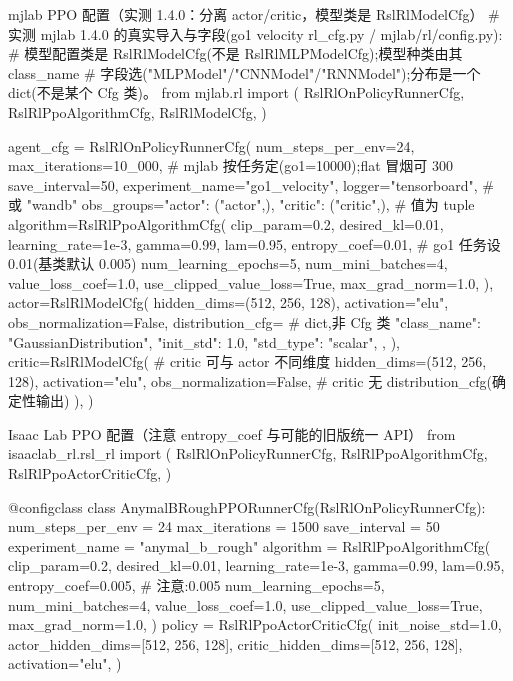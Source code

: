 \begin{codebox}[Python]{mjlab PPO 配置（实测 1.4.0：分离 actor/critic，模型类是 RslRlModelCfg）}
# 实测 mjlab 1.4.0 的真实导入与字段(go1 velocity rl_cfg.py / mjlab/rl/config.py):
#   模型配置类是 RslRlModelCfg(不是 RslRlMLPModelCfg);模型种类由其 class_name
#   字段选("MLPModel"/"CNNModel"/"RNNModel");分布是一个 dict(不是某个 Cfg 类)。
from mjlab.rl import (
    RslRlOnPolicyRunnerCfg, RslRlPpoAlgorithmCfg, RslRlModelCfg,
)

agent_cfg = RslRlOnPolicyRunnerCfg(
    num_steps_per_env=24,
    max_iterations=10_000,         # mjlab 按任务定(go1=10000);flat 冒烟可 300
    save_interval=50,
    experiment_name="go1_velocity",
    logger="tensorboard",          # 或 "wandb"
    obs_groups={"actor": ("actor",), "critic": ("critic",)},  # 值为 tuple
    algorithm=RslRlPpoAlgorithmCfg(
        clip_param=0.2, desired_kl=0.01, learning_rate=1e-3,
        gamma=0.99, lam=0.95, entropy_coef=0.01,   # go1 任务设 0.01(基类默认 0.005)
        num_learning_epochs=5, num_mini_batches=4,
        value_loss_coef=1.0, use_clipped_value_loss=True, max_grad_norm=1.0,
    ),
    actor=RslRlModelCfg(
        hidden_dims=(512, 256, 128), activation="elu",
        obs_normalization=False,
        distribution_cfg={                       # dict,非 Cfg 类
            "class_name": "GaussianDistribution",
            "init_std": 1.0, "std_type": "scalar",
        },
    ),
    critic=RslRlModelCfg(              # critic 可与 actor 不同维度
        hidden_dims=(512, 256, 128), activation="elu",
        obs_normalization=False,        # critic 无 distribution_cfg(确定性输出)
    ),
)
\end{codebox}

\begin{codebox}[Python]{Isaac Lab PPO 配置（注意 entropy\_coef 与可能的旧版统一 API）}
from isaaclab_rl.rsl_rl import (
    RslRlOnPolicyRunnerCfg, RslRlPpoAlgorithmCfg, RslRlPpoActorCriticCfg,
)

@configclass
class AnymalBRoughPPORunnerCfg(RslRlOnPolicyRunnerCfg):
    num_steps_per_env = 24
    max_iterations = 1500
    save_interval = 50
    experiment_name = "anymal_b_rough"
    algorithm = RslRlPpoAlgorithmCfg(
        clip_param=0.2, desired_kl=0.01, learning_rate=1e-3,
        gamma=0.99, lam=0.95, entropy_coef=0.005,   # 注意:0.005
        num_learning_epochs=5, num_mini_batches=4,
        value_loss_coef=1.0, use_clipped_value_loss=True, max_grad_norm=1.0,
    )
    policy = RslRlPpoActorCriticCfg(
        init_noise_std=1.0,
        actor_hidden_dims=[512, 256, 128],
        critic_hidden_dims=[512, 256, 128],
        activation="elu",
    )
\end{codebox}

